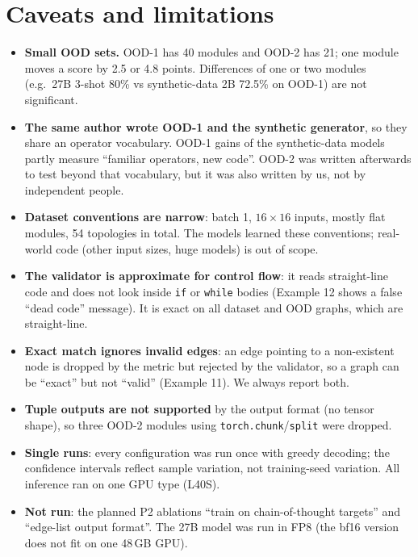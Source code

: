 \documentclass[11pt,a4paper]{article}
\begin{document}
\section{Caveats and limitations}\label{sec:caveats}
\begin{itemize}[leftmargin=*]
\item \textbf{Small OOD sets.} OOD-1 has 40 modules and OOD-2 has 21; one module moves a score by 2.5 or 4.8 points.
Differences of one or two modules (e.g.\ 27B 3-shot 80\% vs synthetic-data 2B 72.5\% on OOD-1) are not significant.
\item \textbf{The same author wrote OOD-1 and the synthetic generator}, so they share an operator vocabulary. OOD-1 gains
of the synthetic-data models partly measure ``familiar operators, new code''. OOD-2 was written afterwards to test
beyond that vocabulary, but it was also written by us, not by independent people.
\item \textbf{Dataset conventions are narrow}: batch 1, $16\times16$ inputs, mostly flat modules, 54 topologies in total.
The models learned these conventions; real-world code (other input sizes, huge models) is out of scope.
\item \textbf{The validator is approximate for control flow}: it reads straight-line code and does not look inside
\texttt{if} or \texttt{while} bodies (Example 12 shows a false ``dead code'' message). It is exact on all dataset and OOD
graphs, which are straight-line.
\item \textbf{Exact match ignores invalid edges}: an edge pointing to a non-existent node is dropped by the metric but
rejected by the validator, so a graph can be ``exact'' but not ``valid'' (Example 11). We always report both.
\item \textbf{Tuple outputs are not supported} by the output format (no tensor shape), so three OOD-2 modules using
\texttt{torch.chunk}/\texttt{split} were dropped.
\item \textbf{Single runs}: every configuration was run once with greedy decoding; the confidence intervals reflect
sample variation, not training-seed variation. All inference ran on one GPU type (L40S).
\item \textbf{Not run}: the planned P2 ablations ``train on chain-of-thought targets'' and ``edge-list output
format''. The 27B model was run in FP8 (the bf16 version does not fit on one 48\,GB GPU).
\end{itemize}
\end{document}
